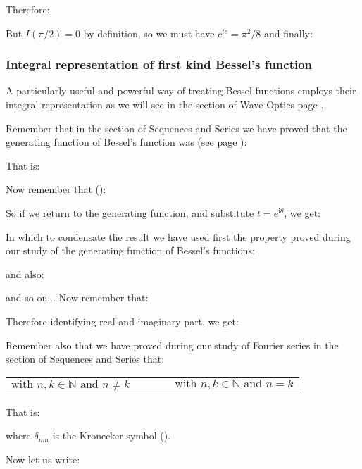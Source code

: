 	\begin{tcolorbox}[colframe=black,colback=white,sharp corners]
	Therefore:
	
	But $I(\pi/2)=0$ by definition, so we must have $c^{te}=\pi^2/8$ and finally:
	
	\end{tcolorbox}
	
	\subsubsection{Integral representation of first kind Bessel's function}\label{integral representation of first kind Bessel's function}
	A particularly useful and powerful way of treating Bessel functions employs their integral representation as we will see in the section of Wave Optics page \pageref{fresnel circular aperture}.
	
	Remember that in the section of Sequences and Series we have proved that the generating function of Bessel's function was (see page \pageref{generating function for bessel function of first kind}):
	
	That is:
	
	Now remember that ():
	
	So if we return to the generating function, and substitute $t=e^{\mathrm{i}\theta}$, we get:
	
	In which to condensate the result we have used first the property proved during our study of the generating function of Bessel's functions:
	
	and also:
	
	and so on...
	Now remember that:
	
	Therefore identifying real and imaginary part, we get:
	
	Remember also that we have proved during our study of Fourier series in the section of Sequences and Series that:
	
	\begin{center}
	\begin{tabular}{ccc}
	$\text{with }n,k\in \mathbb{N}\text{ and }n\ne k$
	&$\qquad$&
	$\text{with }n,k\in \mathbb{N}\text{ and }n = k$
	\end{tabular}
	\end{center}
	That is:
	
	where $\delta_{nm}$ is the Kronecker symbol ().
	
	Now let us write:
	
